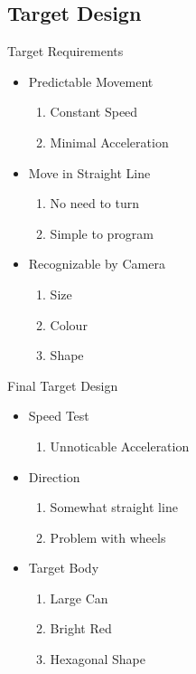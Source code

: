 \subsection{Target Design} 
\begin{frame}{Target Requirements}
\begin{itemize}
    \item Predictable Movement
    	\begin{enumerate}
    	    \item Constant Speed 
  			\item Minimal Acceleration
		\end{enumerate}
    \item Move in Straight Line
    	\begin{enumerate}
  			\item No need to turn
  			\item Simple to program
		\end{enumerate}
    \item Recognizable by Camera
    	\begin{enumerate}
  			\item Size
  			\item Colour
  			\item Shape
		\end{enumerate}
\end{itemize}
\end{frame}

\begin{frame}{Final Target Design}

\begin{itemize}
    \item Speed Test
    	\begin{enumerate}
  			\item Unnoticable Acceleration
		\end{enumerate}
    \item Direction
    	\begin{enumerate}
  			\item Somewhat straight line
  			\item Problem with wheels
		\end{enumerate}
	\item Target Body
		\begin{enumerate}
  			\item Large Can
  			\item Bright Red
  			\item Hexagonal Shape
		\end{enumerate}
\end{itemize}
\end{frame}

